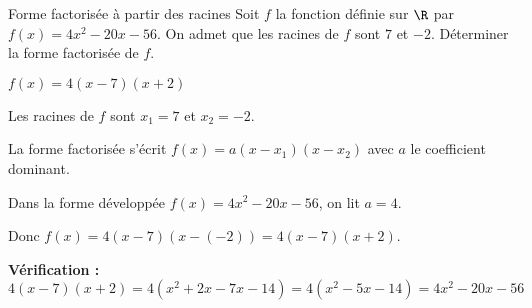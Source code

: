 \begin{EXO}{Forme factorisée à partir des racines}{}
Soit $f$ la fonction définie sur $\R$ par $f(x)=4x^2-20x-56$. On admet que les racines de $f$ sont $7$ et $-2$.  Déterminer la forme factorisée de $f$.

\begin{crep}
$f(x) = 4(x-7)(x+2)$
\end{crep}

\exocorrection

Les racines de $f$ sont $x_1 = 7$ et $x_2 = -2$.

La forme factorisée s'écrit $f(x) = a(x-x_1)(x-x_2)$ avec $a$ le coefficient dominant.

Dans la forme développée $f(x) = 4x^2-20x-56$, on lit $a = 4$.

Donc $f(x) = 4(x-7)(x-(-2)) = 4(x-7)(x+2)$.

\textbf{Vérification :} $4(x-7)(x+2) = 4(x^2+2x-7x-14) = 4(x^2-5x-14) = 4x^2-20x-56$ \checkmark
\end{EXO}